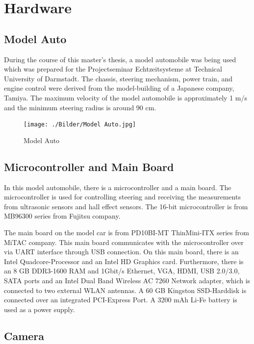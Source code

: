 %
\section{Hardware}\label{sec:Hardware}



%
\subsection{Model Auto}\label{sec:Model Auto}


During the course of this master's thesis, a model automobile was being used which was prepared for the Projectseminar 
Echtzeitsysteme at Technical University of Darmstadt. The chassis, steering mechanism, power train, and engine control 
were derived from the model-building of a Japanese company, Tamiya. The maximum velocity of the model automobile is 
approximately 1 m/s and the minimum steering radius is around 90 cm. 

\begin{figure}[H]
	\centering
	\hspace*{0cm}   
	\texttt{[image: ./Bilder/Model Auto.jpg]}
	\caption{Model Auto}
\end{figure}

%
\subsection{Microcontroller and Main Board}\label{sec:Microcontroller and Main Board}


In this model automobile, there is a microcontroller and a main board. The microcontroller is used for controlling steering 
and receiving the measurements from ultrasonic sensors and hall effect sensors. The 16-bit microcontroller is from 
MB96300 series from Fujitsu company.

The main board on the model car is from PD10BI-MT ThinMini-ITX series from MiTAC company. This main board communicates 
with the microcontroller over via UART interface through USB connection. On this main board, there is an Intel 
Quadcore-Processor and an Intel HD Graphics card. Furthermore, there is an 8 GB DDR3-1600 RAM and 1Gbit/s Ethernet, VGA, HDMI, USB 2.0/3.0, SATA ports and an Intel Dual Band Wireless AC 7260 Network adapter, which is connected to two external WLAN antennas. A 60 GB Kingston SSD-Harddisk is connected over an integrated PCI-Express Port. A 3200 mAh Li-Fe battery is used as a power supply.
%

\subsection{Camera}\label{sec:Camera}



